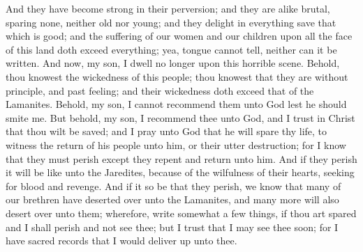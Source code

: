 And they have become strong in their perversion; and they are alike brutal, sparing none, neither old nor young; and they delight in everything save that which is good; and the suffering of our women and our children upon all the face of this land doth exceed everything; yea, tongue cannot tell, neither can it be written.
\bverse \iffalse And now, my son, I dwell no longer upon this horrible scene.  Behold, thou knowest the wickedness of this people; thou knowest that they are without principle, and past feeling; and their wickedness doth exceed that of the Lamanites. \fi
And now, my son, I dwell no longer upon this horrible scene.  Behold, thou knowest the wickedness of this people; thou knowest that they are without principle, and past feeling; and their wickedness doth exceed that of the Lamanites.
\bverse \iffalse Behold, my son, I cannot recommend them unto God lest he should smite me. \fi
Behold, my son, I cannot recommend them unto God lest he should smite me.
\bverse \iffalse But behold, my son, I recommend thee unto God, and I trust in Christ that thou wilt be saved; and I pray unto God that he will spare thy life, to witness the return of his people unto him, or their utter destruction; for I know that they must perish except they repent and return unto him. \fi
But behold, my son, I recommend thee unto God, and I trust in Christ that thou wilt be saved; and I pray unto God that he will spare thy life, to witness the return of his people unto him, or their utter destruction; for I know that they must perish except they repent and return unto him.
\bverse \iffalse And if they perish it will be like unto the Jaredites, because of the wilfulness of their hearts, seeking for blood and revenge. \fi
And if they perish it will be like unto the Jaredites, because of the wilfulness of their hearts, seeking for blood and revenge.
\bverse \iffalse And if it so be that they perish, we know that many of our brethren have deserted over unto the Lamanites, and many more will also desert over unto them; wherefore, write somewhat a few things, if thou art spared and I shall perish and not see thee; but I trust that I may see thee soon; for I have sacred records that I would deliver up unto thee. \fi
And if it so be that they perish, we know that many of our brethren have deserted over unto the Lamanites, and many more will also desert over unto them; wherefore, write somewhat a few things, if thou art spared and I shall perish and not see thee; but I trust that I may see thee soon; for I have sacred records that I would deliver up unto thee.
